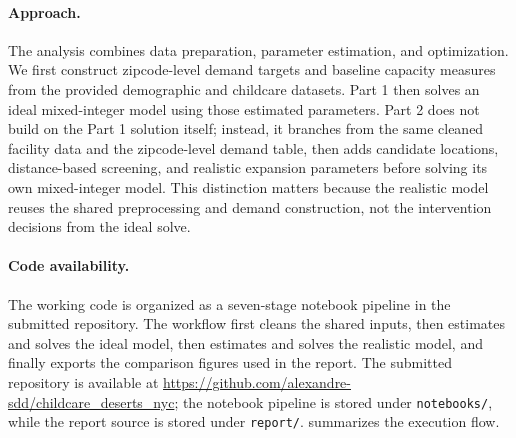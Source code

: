 \documentclass[11pt]{article}
\newcommand{\1}{\mathbb{I}}
\begin{document}
\paragraph{Approach.}
The analysis combines data preparation, parameter estimation, and optimization. We first construct zipcode-level demand targets and baseline capacity measures from the provided demographic and childcare datasets. Part 1 then solves an ideal mixed-integer model using those estimated parameters. Part 2 does not build on the Part 1 solution itself; instead, it branches from the same cleaned facility data and the zipcode-level demand table, then adds candidate locations, distance-based screening, and realistic expansion parameters before solving its own mixed-integer model. This distinction matters because the realistic model reuses the shared preprocessing and demand construction, not the intervention decisions from the ideal solve.

\paragraph{Code availability.}
The working code is organized as a seven-stage notebook pipeline in the submitted repository. The workflow first cleans the shared inputs, then estimates and solves the ideal model, then estimates and solves the realistic model, and finally exports the comparison figures used in the report. The submitted repository is available at \url{https://github.com/alexandre-sdd/childcare_deserts_nyc}; the notebook pipeline is stored under \texttt{notebooks/}, while the report source is stored under \texttt{report/}.  summarizes the execution flow.
\end{document}
